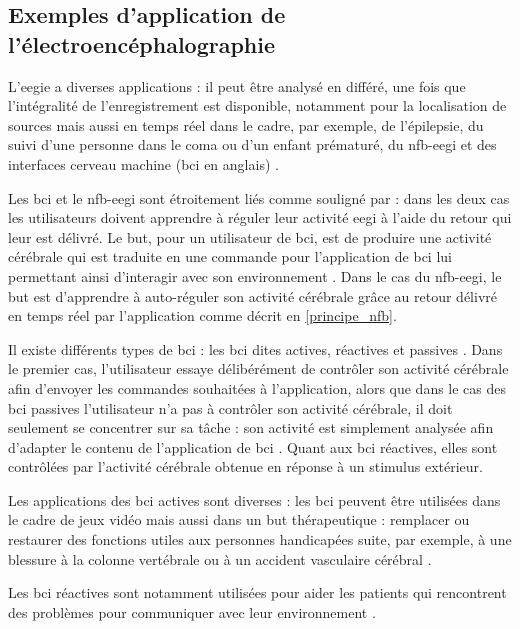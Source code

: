 \subsection{Exemples d'application de l'électroencéphalographie}

L'\gls{eegie} a diverses applications : il peut être analysé en différé, une fois que l'intégralité de l'enregistrement est disponible, notamment pour la localisation de sources \citep{Latif2006} 
mais aussi en temps réel dans le cadre, par exemple, de l'épilepsie, du suivi d'une personne dans 
le coma ou d'un enfant prématuré, du \gls{nfb}-\gls{eegi} et des interfaces cerveau machine (\gls{bci} en anglais) \citep{Li2010}. 

Les \gls{bci} et le \gls{nfb}-\gls{eegi} sont étroitement liés comme souligné par \citet{Jeunet2018} : dans les deux cas les utilisateurs doivent apprendre à réguler leur activité \gls{eegi} à l'aide du retour 
qui leur est délivré. Le but, pour un utilisateur de \gls{bci}, est de produire une activité cérébrale qui est traduite en une commande pour l'application de \gls{bci} lui permettant ainsi d'interagir 
avec son environnement \citep{Enriquez2017, Birbaumer2009}. Dans le cas du \gls{nfb}-\gls{eegi}, le but est d'apprendre à auto-réguler son activité cérébrale grâce au retour délivré en temps réel par l'application 
\citep{Enriquez2017, Jeunet2018} comme décrit en \ref{principe_nfb}.

Il existe différents types de \gls{bci} : les \gls{bci} dites actives, réactives et passives \citep{Mudgal2020}. Dans le premier cas, l'utilisateur essaye délibérément de contrôler son activité cérébrale afin
d'envoyer les commandes souhaitées à l'application, alors que dans le cas des \gls{bci} passives l'utilisateur n'a pas à contrôler son activité cérébrale, il doit seulement
se concentrer sur sa tâche : son activité est simplement analysée afin d'adapter le contenu de l'application de \gls{bci} \citep{George2014}. Quant aux \gls{bci} réactives, elles sont contrôlées 
par l'activité cérébrale obtenue en réponse à un stimulus extérieur.

Les applications des \gls{bci} actives sont diverses : les \gls{bci} peuvent être utilisées dans le cadre de jeux vidéo \citep{Kerous2018} mais aussi dans un but thérapeutique : remplacer ou
restaurer des fonctions utiles aux personnes handicapées suite, par exemple, à une blessure à la colonne vertébrale ou à un accident vasculaire cérébral \citep{Shih2012}. 

Les \gls{bci} réactives sont notamment utilisées pour aider les patients qui rencontrent des problèmes pour communiquer avec leur environnement \citep{Guy2018}. 

